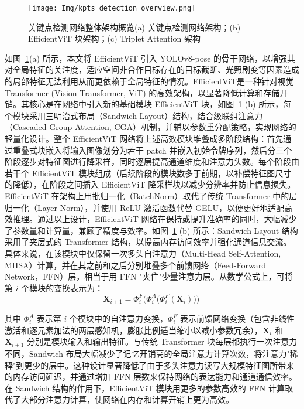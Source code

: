 \begin{figure}[htbp]
	\centering
	\texttt{[image: Img/kpts\_detection\_overview.png]}
	\caption{关键点检测网络整体架构概览(a) 关键点检测网络架构；(b) EfficientViT 块架构；(c) Triplet Attention 架构}
	\label{fig:keypoint_detection_neural_network}
\end{figure}

如图~\ref{fig:keypoint_detection_neural_network}(a) 所示，本文将 EfficientViT 引入 YOLOv8-pose 的骨干网络，以增强其对全局特征的关注度，适应空间非合作目标存在的目标截断、光照剧变等因素造成的局部特征无法利用从而更依赖于全局特征的情况。EfficientViT\cite{liu2023efficientvit}是一种针对视觉 Transformer (Vision Transformer, ViT) 的高效架构，以显著降低计算和存储开销。其核心是在网络中引入新的基础模块 EfficientViT 块，如图~\ref{fig:keypoint_detection_neural_network} (b) 所示，每个模块采用三明治式布局（Sandwich Layout）结构，结合级联组注意力（Cascaded Group Attention, CGA）机制，并辅以参数重分配策略，实现网络的轻量化设计。整个 EfficientViT 网络将上述高效模块堆叠成多阶段结构：首先通过重叠式块嵌入将输入图像划分为若干 patch 并嵌入初始令牌序列，然后分三个阶段逐步对特征图进行降采样，同时逐层提高通道维度和注意力头数。每个阶段由若干个 EfficientViT 模块组成（后续阶段的模块数多于前期，以补偿特征图尺寸的降低），在阶段之间插入 EfficientViT 降采样块以减少分辨率并防止信息损失。EfficientViT 在架构上用批归一化（BatchNorm）取代了传统 Transformer 中的层归一化（Layer Norm），并使用 ReLU 激活函数代替 GELU，以便更好地适配高效推理。通过以上设计，EfficientViT 网络在保持或提升准确率的同时，大幅减少了参数量和计算量，兼顾了精度与效率。如图~\ref{fig:keypoint_detection_neural_network} (b) 所示：Sandwich Layout 结构采用了夹层式的 Transformer 结构，以提高内存访问效率并强化通道信息交流。具体来说，在该模块中仅保留一次多头自注意力（Multi-Head Self-Attention,  MHSA）计算，并在其之前和之后分别堆叠多个前馈网络（Feed-Forward Network，FFN）层，相当于用 FFN "夹住"少量注意力层。从数学公式上，可将第 $i$ 个模块的变换表示为：
\begin{equation}\label{eq:sandwich}
	\mathbf{X}_{i+1} = \Phi^F_i\Big(\Phi^A_i\big(\Phi^F_i(\mathbf{X}_i)\big)\Big)\,
\end{equation}

其中 $\Phi^A_i$ 表示第 $i$ 个模块中的自注意力变换，$\Phi^F_i$ 表示前馈网络变换（包含非线性激活和逐元素加法的两层感知机，膨胀比例适当缩小以减小参数冗余），$\mathbf{X}_i$ 和 $\mathbf{X}_{i+1}$ 分别是模块输入和输出特征。与传统 Transformer 块每层都执行一次注意力不同，Sandwich 布局大幅减少了记忆开销高的全局注意力计算次数，将注意力"稀释"到更少的层中。这种设计显著降低了由于多头注意力读写大规模特征图所带来的内存访问延迟，并通过增加 FFN 层数来保持网络的表达能力和通道通信效率。在 Sandwich 结构的作用下，EfficientViT 模块用更多的参数高效的 FFN 计算取代了大部分注意力计算，使网络在内存和计算开销上更为高效。

